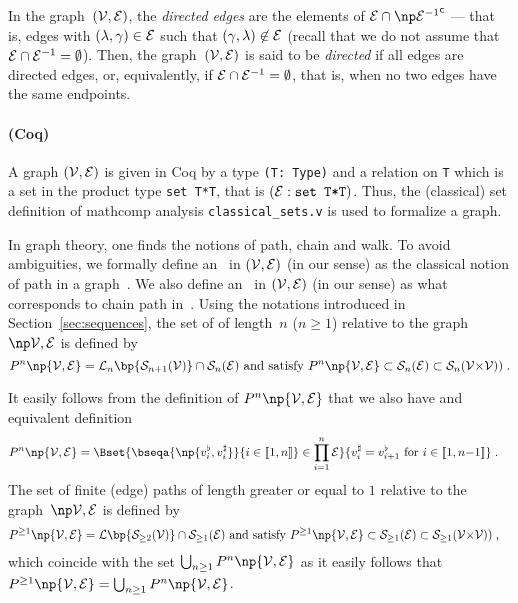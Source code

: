 \documentclass[12pt]{article}
\def\citep#1{\cite{#1}}
\begin{document}
{{In the graph~$({\cal V},{\cal E})$, 
the \emph{directed edges} are the elements of
$\EDGE \cap \npComplementary{ \Converse{\EDGE} }$ --- that is, 
edges with $(\lambda,\gamma)\in {\cal E}$ such that $(\gamma, \lambda)\not\in {\cal E}$
(recall that we do not assume that ${\cal E} \cap {\cal E}^{-1}=\emptyset$).
Then, the graph~$({\cal V},{\cal E})$ is said to be \emph{directed} if
all edges are directed edges, 
or, equivalently, if 
\( {\cal E} \cap {\cal E}^{-1}=\emptyset \), that is, 
when no two edges have the same endpoints.

\paragraph{(Coq)} A graph $({\cal V},{\cal E})$ is given in Coq by a type \texttt{(T: Type)} and a relation on
\texttt{T} which is a set in the product type \texttt{set T*T}, that is
$({\cal E}:\texttt{set T*T})$. Thus, the (classical) set definition of mathcomp
analysis \texttt{classical\_sets.v} is used to formalize a graph.
\medskip

In graph theory, one finds the notions of path, chain and walk. 
To avoid ambiguities,
we formally define an \EdgePath\ in $({\cal V},{\cal E})$ (in our sense) 
as the classical notion of path in a graph~\citep{Diestel}.
We also define an \undirectedEdgePath\ in $({\cal V},{\cal E})$ (in our sense)
as what corresponds to chain path in~\citep{Lauritzen-et-al-1990}.
\medskip
Using the notations introduced in Section~\ref{sec:sequences}, 
the set of \emph{\EdgePath} of length~$n$ ($n\ge 1$) relative to the graph~$\npOrientedGraph$ is defined by
\begin{equation}
  \PATH^n\np{\OrientedGraph} =
  \Lift_n \bp{ \Sequence_{n+1}(\VERTEX)} \cap \Sequence_{n}(\EDGE)
  \text{ and satisfy } \PATH^n\np{\OrientedGraph} \subset \Sequence_{n}(\EDGE) \subset \Sequence_{n}(\VERTEX{\times}\VERTEX))
  \eqfinp
\end{equation}

It easily follows from the definition of $\PATH^n\np{\OrientedGraph}$ that we also have and equivalent definition
\begin{align}
  \PATH^n\np{\OrientedGraph} %
  &=
    \Bset{ \bseqa{ \np{\tail{\vertex_i},\head{\vertex_i}} }{i\in\ic{1,n}} \in \SetProd{\EDGE}{n} }
    { \head{\vertex_i}=\tail{\vertex_{i+1}} \text{ for } i\in\ic{1,n{-}1}}
    \eqfinp
\end{align}
The set of finite (edge) paths of length greater or equal to $1$ relative to the graph~$\npOrientedGraph$ is defined by
\begin{align}
  \PATH^{\ge 1}\np{\OrientedGraph}
  &=
    \Lift\bp{ \Sequence_{\ge 2}(\VERTEX)} \cap \Sequence_{\ge 1}(\EDGE)
    \text{ and satisfy } \PATH^{\ge 1}\np{\OrientedGraph}  \subset \Sequence_{\ge 1}(\EDGE)  \subset \Sequence_{\ge 1}(\VERTEX{\times}\VERTEX))
    \eqfinv
    \label{def:epaths_gt1}
\end{align}
which coincide with the set $\bigcup_{n\ge 1} \PATH^n\np{\OrientedGraph}$ as it easily follows that
$\PATH^{\ge 1}\np{\OrientedGraph} = \bigcup_{n\ge 1} \PATH^n\np{\OrientedGraph}$.

}}
\end{document}
